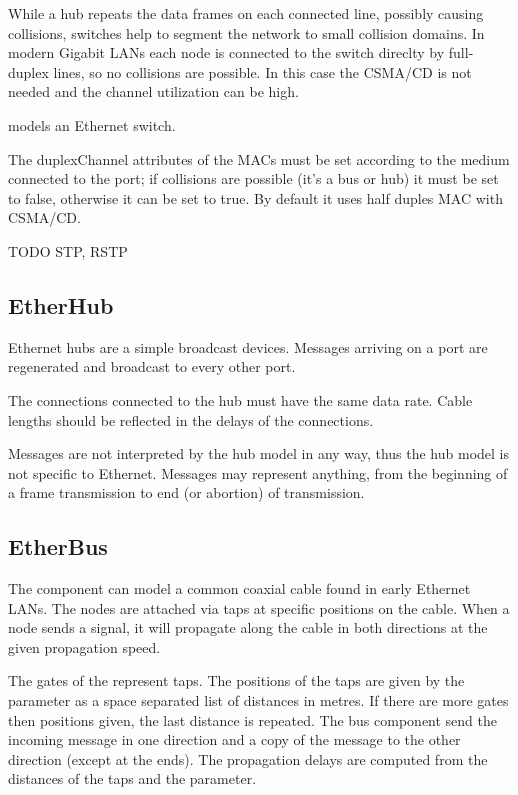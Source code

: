 While a hub repeats the data frames on each connected line, possibly causing
collisions, switches help to segment the network to small collision domains.
In modern Gigabit LANs each node is connected to the switch direclty
by full-duplex lines, so no collisions are possible. In this case the
CSMA/CD is not needed and the channel utilization can be high.

 models an Ethernet switch.

The duplexChannel attributes of the MACs must be set according to the
medium connected to the port; if collisions are possible (it's a bus or hub)
it must be set to false, otherwise it can be set to true.
By default it uses half duples MAC with CSMA/CD.

TODO STP, RSTP

\subsection{EtherHub}

Ethernet hubs are a simple broadcast devices. Messages arriving on a port
are regenerated and broadcast to every other port.

The connections connected to the hub must have the same data rate.
Cable lengths should be reflected in the delays of the connections.

Messages are not interpreted by the  hub model in any way,
thus the hub model is not specific to Ethernet. Messages may
represent anything, from the beginning of a frame transmission to
end (or abortion) of transmission.



\subsection{EtherBus}

The  component can model a common coaxial cable
found in early Ethernet LANs. The nodes are attached via taps at specific
positions on the cable. When a node sends a signal, it will propagate
along the cable in both directions at the given propagation speed.

The gates of the  represent taps. The positions
of the taps are given by the  parameter as a
space separated list of distances in metres. If there are more
gates then positions given, the last distance is repeated.
The bus component send the incoming message in one direction and
a copy of the message to the other direction (except at the ends).
The propagation delays are computed from the distances of the taps
and the  parameter.

